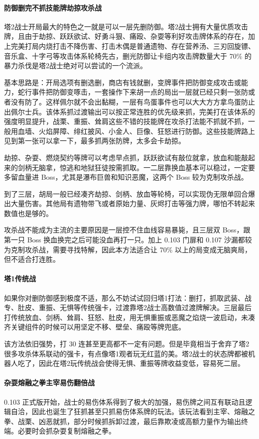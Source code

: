 ﻿\documentclass[12pt, a4paper]{article}
\begin{document}
\paragraph{防御删完不抓技能牌劫掠攻杀战}
塔2战士开局最大的特色之一就是可以一层先删防御。塔2战士拥有大量优质攻击牌，且由于劫掠、跃跃欲试、好勇斗狠、痛殴、杂耍等利好攻击牌体系的存在，加上完美打局内烧打击不降伤害、打击木偶是普通遗物、存在营养汤、三刃回旋镖、音乐盒、十字弓等攻击体系轮椅先古，删光防御让卡组内攻击牌数量大于 70\% 的暴力杀伐是塔2战士绝对可以尝试的一个流派。

基本思路是：开局选项有删选删，商店有钱就删，变牌事件把防御变成攻击或能力，蛇行事件把防御变啄击，一套操作下来胡一点的局出一层就已经只剩一张防或者没有防了。这样佩尔就不会出黏糊，一层有鸟蛋事件也可以大大方方拿鸟蛋防止出佩尔士兵。该体系抓过渡输出可以按正常连胜的优先级来抓，完美打在该体系的强度明显提升，战栗、重振、耸肩这些不错的技能牌在攻杀打法能不抓就不抓，一般用血墙、火焰屏障、绯红披风、小金人、巨像、狂怒进行防御。这些技能牌路上见到第一张可以拿一下，最多抓两张防牌，太多会卡劫掠。

劫掠、杂耍、燃烧契约等牌可以考虑早点抓，跃跃欲试有敲位就拿，放血和能敲起来的剑柄无脑拿，惊逃和地狱狂徒按需抓取。一二层靠换血基本可以稳过，一定要多留血量进 Boss，尤其是瀑布巨兽和知识恶魔，这两个 Boss 较为克制攻杀战。

到了三层，胡局一般已经凑齐劫掠、剑柄、放血等轮椅，可以实现伪无限单回合爆出大量伤害。其他局有遗物带飞或者原始力量、灰烬打击等强力牌，哪怕不转起来数值也是够的。

攻杀战不能成为主流的主要原因是一层控不住血线容易暴毙，且三层双 Boss，跟第一只 Boss 换血换完之后可能没血再打一只。加上 0.103 门扉和 0.107 沙漏都较为克制攻杀战，需要寻找特解，因此本方法适合让 70\% 以上的局变成无脑爽局，但不适合打连胜。

\paragraph{塔1传统战}
如果你对删防御感到极度不适，那么不妨试试回归塔1打法：删打，抓取武装、战专、肚皮、重振、无惧等传统强卡，过渡靠塔2战士高数值过渡牌解决。三层最后打传统放血、剑柄、耸肩、狂怒、肚皮，用无惧重振或恶魔之焰烧一波启动，未凑齐关键组件的时候可以用坚定不移、壁垒、痛殴等牌兜底。

该方法依旧强势，打 30 连甚至更高都不一定有问题。但是毕竟相当于舍弃了塔2很多攻杀体系联动的强卡，有点像塔1观者玩无红蓝的美。塔2战士的状态牌都被机器人吃了，因此在塔2玩传统战会使得无惧、重振等牌收益变低，容易死二层。

\paragraph{杂耍熔融之拳主宰易伤翻倍战}
0.103 正式版开始，战士的易伤体系得到了极大的加强，易伤牌之间互有联动且逻辑自洽，因此也诞生了狂抓甚至只抓易伤体系牌的玩法。该玩法看到主宰、熔融之拳、战栗、凶恶就抓，部分时候抓拆卸过渡，最后靠欺凌或高额力量作为输出终端。必要时会抓杂耍复制熔融之拳。
\end{document}
